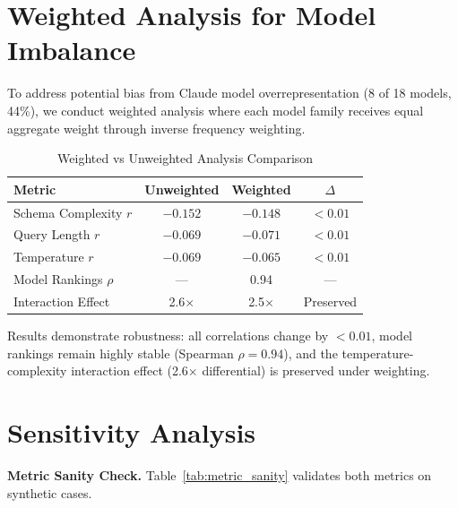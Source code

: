 \documentclass[sigconf,anonymous,review]{acmart}
\begin{document}
\appendix

\section{Weighted Analysis for Model Imbalance}
\label{app:weighted}

To address potential bias from Claude model overrepresentation (8 of 18 models, 44\%), we conduct weighted analysis where each model family receives equal aggregate weight through inverse frequency weighting.

\begin{table}[h]
\centering
\caption{Weighted vs Unweighted Analysis Comparison}
\label{tab:weighted}
\small
\begin{tabular}{@{}lccc@{}}
\toprule
\textbf{Metric} & \textbf{Unweighted} & \textbf{Weighted} & \textbf{$\Delta$} \\
\midrule
Schema Complexity $r$ & $-0.152$ & $-0.148$ & $<0.01$ \\
Query Length $r$ & $-0.069$ & $-0.071$ & $<0.01$ \\
Temperature $r$ & $-0.069$ & $-0.065$ & $<0.01$ \\
Model Rankings $\rho$ & --- & 0.94 & --- \\
Interaction Effect & 2.6$\times$ & 2.5$\times$ & Preserved \\
\bottomrule
\end{tabular}
\end{table}

Results demonstrate robustness: all correlations change by $<0.01$, model rankings remain highly stable (Spearman $\rho = 0.94$), and the temperature-complexity interaction effect (2.6$\times$ differential) is preserved under weighting.

\section{Sensitivity Analysis}
\label{app:sensitivity}

\textbf{Metric Sanity Check.} Table~\ref{tab:metric_sanity} validates both metrics on synthetic cases.
\end{document}
